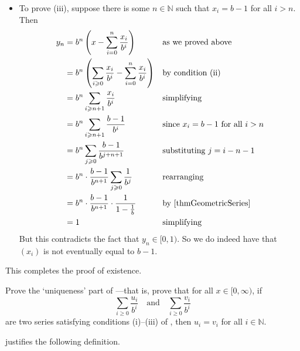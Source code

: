 \begin{cproof}[of existence]
\begin{itemize}
\item To prove (iii), suppose there is some $n \in \mathbb{N}$ such that $x_i = b-1$ for all $i > n$. Then
\begin{align*}
y_n &= b^n\left( x-\sum_{i=0}^n \dfrac{x_i}{b^i} \right) && \text{as we proved above} \\
&= b^n \left( \sum_{i \ge 0} \frac{x_i}{b^i} - \sum_{i=0}^n \frac{x_i}{b^i} \right) && \text{by condition (ii)} \\
&= b^n \sum_{i \ge n+1} \frac{x_i}{b^i} && \text{simplifying} \\
&= b^n \sum_{i \ge n+1} \frac{b-1}{b^i} && \text{since $x_i = b-1$ for all $i > n$} \\
&= b^n \sum_{j \ge 0} \frac{b-1}{b^{j+n+1}} && \text{substituting $j=i-n-1$} \\
&= b^n \cdot \dfrac{b-1}{b^{n+1}} \sum_{j \ge 0} \frac{1}{b^j} && \text{rearranging} \\
&= b^n \cdot \frac{b-1}{b^{n+1}} \cdot \frac{1}{1-\frac{1}{b}} && \text{by \Cref{thmGeometricSeries}} \\
&= 1 && \text{simplifying}
\end{align*}
But this contradicts the fact that $y_n \in [0,1)$. So we do indeed have that $(x_i)$ is not eventually equal to $b-1$.
\end{itemize}

This completes the proof of existence.
\end{cproof}

\begin{exercise}
Prove the `uniqueness' part of ---that is, prove that for all $x \in [0,\infty)$, if
\[ \sum_{i \ge 0} \dfrac{u_i}{b^i} \quad \text{and} \quad \sum_{i \ge 0} \dfrac{v_i}{b^i} \]
are two series satisfying conditions (i)--(iii) of , then $u_i=v_i$ for all $i \in \mathbb{N}$.
\end{exercise}

 justifies the following definition.

